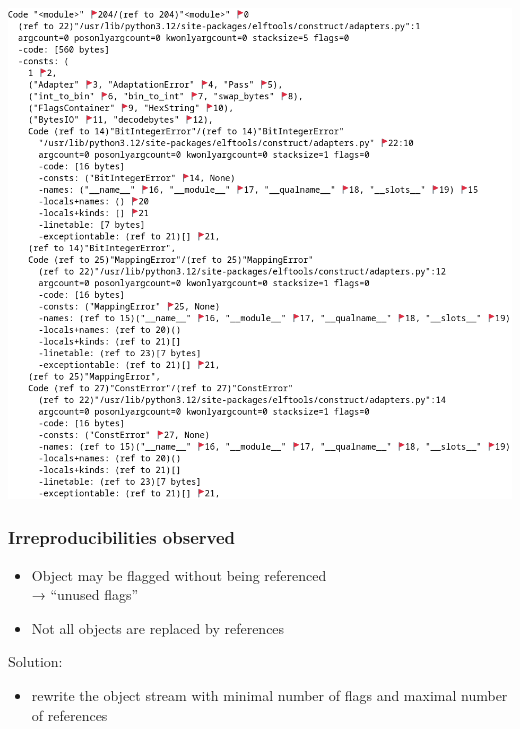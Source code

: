 \documentclass[]{beamer}
\begin{document}
\begin{frame}
  \includegraphics[width=\textwidth]{images/pyc-dump.png}
\end{frame}

\begin{frame}
  \frametitle{Irreproducibilities observed}

  \begin{itemize}
    \pause
  \item Object may be flagged without being referenced\\
    → ``unused flags''
    \pause
  \item Not all objects are replaced by references
  \end{itemize}

  \vfill
  \pause

  Solution:\\\pause
  \begin{itemize}
  \item rewrite the object stream with minimal number of flags and maximal number of references
  \end{itemize}
\end{frame}
\end{document}
